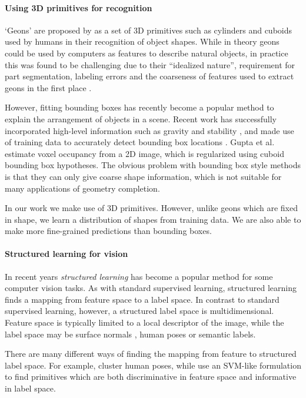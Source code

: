 \documentclass[10pt,twocolumn,letterpaper]{article}
\makeatletter
\newcommand*{\ea}{et al.\@\xspace}
\makeatother
\begin{document}
\paragraph{Using 3D primitives for recognition}

`Geons' are proposed by \cite{bieberman-rbc-1987} as a set of 3D primitives such as cylinders and cuboids used by humans in their recognition of object shapes.
While in theory geons could be used by computers  as features to describe natural objects, in practice this was found to be challenging due to their ``idealized nature'', requirement for part segmentation, labeling errors and the coarseness of features used to extract geons in the first place \cite{dickinson-iavc-1997}.

However, fitting bounding boxes has recently become a popular method to explain the arrangement of objects in a scene.
Recent work has successfully incorporated high-level information such as gravity and stability
 \cite{shao-siggraphasia-2014, jia-cvpr-2013}, and made use of training data to accurately detect bounding box locations \cite{hedau-cvpr-2012}.
Gupta \ea \cite{gupta-cvpr-2011} estimate voxel occupancy from a 2D image, which is regularized using cuboid bounding box hypotheses.
The obvious problem with bounding box style methods is that they can only give coarse shape information, which is not suitable for many applications of geometry completion.

In our work we make use of 3D primitives.
However, unlike geons which are fixed in shape, we learn a distribution of shapes from training data.
We are also able to make more fine-grained predictions than bounding boxes.

\paragraph{Structured learning for vision}
In recent years \emph{structured learning} has become a popular method for some computer vision tasks.
As with standard supervised learning, structured learning finds a mapping from feature space to a label space.
In contrast to standard supervised learning, however, a structured label space is multidimensional.
Feature space is typically limited to a local descriptor of the image, while the label space may be surface normals \cite{fouhey-iccv-2013}, human poses \cite{bourdev-iccv-2009} or semantic labels.

There are many different ways of finding the mapping from feature to structured label space.
For example, \cite{bourdev-iccv-2009} cluster human poses, while \cite{fouhey-iccv-2013} use an SVM-like formulation to find primitives which are both discriminative in feature space and informative in label space.
\end{document}
